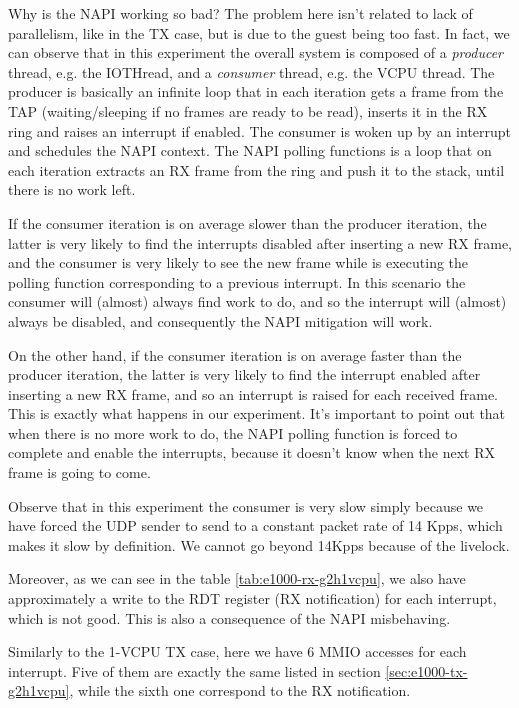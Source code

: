 \vspace{0.5cm}

Why is the NAPI working so bad? The problem here isn't related to lack of parallelism, like in the TX case, but is due to the guest being
too fast. In fact, we can observe that in this experiment the overall system is composed of a \emph{producer} thread, e.g. the IOTHread,
and a \emph{consumer} thread, e.g. the VCPU thread. The producer is basically an infinite loop that in each iteration gets a frame from the
TAP (waiting/sleeping if no frames are ready to be read),
inserts it in the RX ring and raises an interrupt if enabled. The consumer is woken up by an interrupt and schedules the NAPI context.
The NAPI polling functions is a loop that on each iteration extracts an RX frame from the ring and push it to the stack, until there is no
work left.

If the consumer iteration is on average slower than the producer iteration, the latter is very likely to find the interrupts disabled
after inserting a new RX frame, and the consumer is very likely to see the new frame while is executing the polling function corresponding
to a previous interrupt. In this scenario the consumer will (almost) always find work to do, and so the interrupt will (almost) always
be disabled, and consequently the NAPI mitigation will work.

On the other hand, if the consumer iteration is on average faster than the producer iteration, the latter is very likely to find the
interrupt enabled after inserting a new RX frame, and so an interrupt is raised for each received frame. This is exactly what happens
in our experiment. It's important to point out that when there is no more work to do, the NAPI polling function is forced to complete 
and enable the interrupts, because it doesn't know when the next RX frame is going to come.

Observe that in this experiment the consumer is very slow simply because we have forced the UDP sender to send to a 
constant packet rate of 14 Kpps, which makes it slow by definition. We cannot go beyond 14Kpps because of the livelock.

\vspace{0.5cm}

Moreover, as we can see in the table \ref{tab:e1000-rx-g2h1vcpu}, we also have approximately a write to the RDT register (RX 
notification) for each interrupt, which is not good. This is also a consequence of the NAPI misbehaving.

Similarly to the 1-VCPU TX case, here we have 6 MMIO accesses for each interrupt. Five of them are exactly the same listed in
section \ref{sec:e1000-tx-g2h1vcpu}, while the sixth one correspond to the RX notification.


